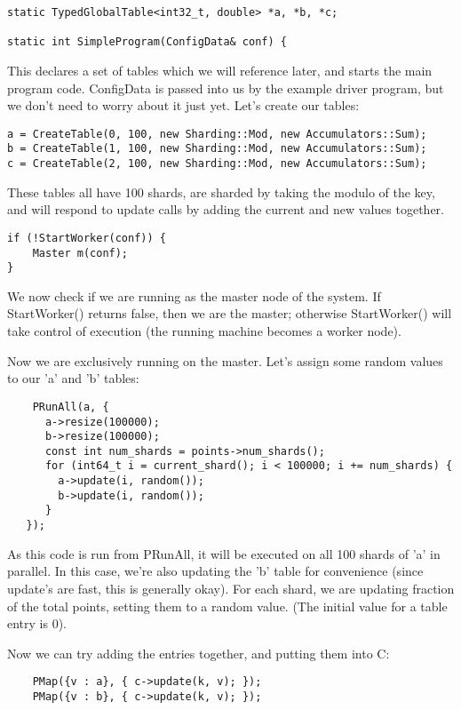 \documentclass[10pt]{article}
\begin{document}
\begin{lstlisting}
static TypedGlobalTable<int32_t, double> *a, *b, *c;

static int SimpleProgram(ConfigData& conf) {
\end{lstlisting} 

This declares a set of tables which we will reference later, and starts the main
program code. {\ttfamily ConfigData} is passed into us by the example driver
program, but we don't need to worry about it just yet.  Let's create our tables:

\begin{lstlisting}
a = CreateTable(0, 100, new Sharding::Mod, new Accumulators::Sum);
b = CreateTable(1, 100, new Sharding::Mod, new Accumulators::Sum);
c = CreateTable(2, 100, new Sharding::Mod, new Accumulators::Sum);
\end{lstlisting}

These tables all have 100 shards, are sharded by taking the modulo of the key,
and will respond to update calls by adding the current and new values together.

\begin{lstlisting}
if (!StartWorker(conf)) {
    Master m(conf);
}   
\end{lstlisting}

We now check if we are running as the master node of the system.  If
StartWorker() returns false, then we are the master; otherwise StartWorker()
will take control of execution (the running machine becomes a worker node).

Now we are exclusively running on the master.  Let's assign some random values
to our 'a' and 'b' tables:
\begin{lstlisting}
    PRunAll(a, {
      a->resize(100000);
      b->resize(100000);
      const int num_shards = points->num_shards();
      for (int64_t i = current_shard(); i < 100000; i += num_shards) {
        a->update(i, random());
        b->update(i, random()); 
      }      
   });
\end{lstlisting}

As this code is run from PRunAll, it will be executed on all 100 shards of 'a'
in parallel.  In this case, we're also updating the 'b' table for convenience
(since update's are fast, this is generally okay).  For each shard, we are
updating fraction of the total points, setting them to a random value.  (The
initial value for a table entry is 0).

Now we can try adding the entries together, and putting them into C:
\begin{lstlisting}
    PMap({v : a}, { c->update(k, v); });
    PMap({v : b}, { c->update(k, v); });
\end{lstlisting}
\end{document}
